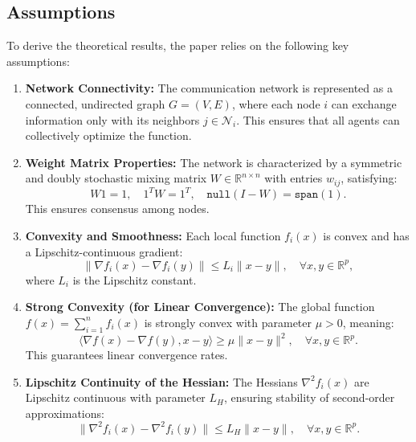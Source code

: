 \documentclass[10pt,english]{article}
\begin{document}
\subsection{Assumptions}

To derive the theoretical results, the paper relies on the following key assumptions:

\begin{enumerate}
    \item \textbf{Network Connectivity:}  
    The communication network is represented as a connected, undirected graph \( G = (V, E) \), where each node \( i \) can exchange information only with its neighbors \( j \in \mathcal{N}_i \). This ensures that all agents can collectively optimize the function.

    \item \textbf{Weight Matrix Properties:}  
    The network is characterized by a symmetric and doubly stochastic mixing matrix \( W \in \mathbb{R}^{n \times n} \) with entries \( w_{ij} \), satisfying:
    \begin{equation}
        W1 = 1, \quad 1^T W = 1^T, \quad \texttt{null}(I - W) = \texttt{span}(1).
    \end{equation}
    This ensures consensus among nodes.

    \item \textbf{Convexity and Smoothness:}  
    Each local function \( f_i(x) \) is convex and has a Lipschitz-continuous gradient:
    \begin{equation}
        \|\nabla f_i(x) - \nabla f_i(y)\| \leq L_i \|x - y\|, \quad \forall x, y \in \mathbb{R}^p,
    \end{equation}
    where \( L_i \) is the Lipschitz constant.

    \item \textbf{Strong Convexity (for Linear Convergence):}  
    The global function \( f(x) = \sum_{i=1}^{n} f_i(x) \) is strongly convex with parameter \( \mu > 0 \), meaning:
    \begin{equation}
        \langle \nabla f(x) - \nabla f(y), x - y \rangle \geq \mu \|x - y\|^2, \quad \forall x, y \in \mathbb{R}^p.
    \end{equation}
    This guarantees linear convergence rates.

    \item \textbf{Lipschitz Continuity of the Hessian:}  
    The Hessians \( \nabla^2 f_i(x) \) are Lipschitz continuous with parameter \( L_H \), ensuring stability of second-order approximations:
    \begin{equation}
        \|\nabla^2 f_i(x) - \nabla^2 f_i(y)\| \leq L_H \|x - y\|, \quad \forall x, y \in \mathbb{R}^p.
    \end{equation}


\end{enumerate}
\end{document}
